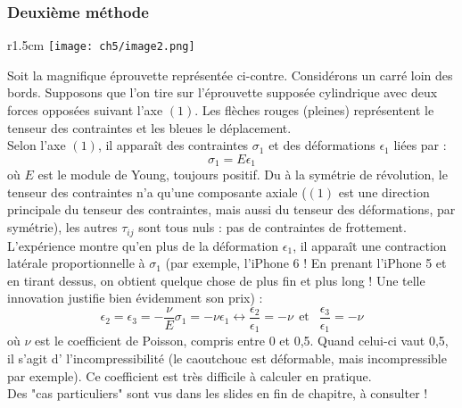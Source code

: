 \subsubsection{Deuxième méthode}
\begin{wrapfigure}[15]{r}{1.5cm}
	\texttt{[image: ch5/image2.png]}
\end{wrapfigure}
Soit la magnifique éprouvette représentée ci-contre. Considérons un carré loin des bords.
Supposons que l'on tire sur l'éprouvette supposée cylindrique avec deux forces opposées 
suivant l'axe $(1)$. Les flèches rouges (pleines) représentent le tenseur des contraintes
et les bleues le déplacement.\\
Selon l'axe $(1)$, il apparaît des contraintes $\sigma_1$ et des déformations $\epsilon_1$ 
liées par :
\begin{equation}
	\sigma_1 = E\epsilon_1
\end{equation}
où $E$ est le module de Young, toujours positif. Du à la symétrie de révolution, le tenseur
des contraintes n'a qu'une composante axiale ($(1)$ est une direction principale du tenseur
des contraintes, mais aussi du tenseur des déformations, par symétrie), les autres $
\tau_{ij}$ sont tous nuls : pas de contraintes de frottement.\\
    
L'expérience montre qu'en plus de la déformation $\epsilon_1$, il apparaît une contraction 
latérale proportionnelle à $\sigma_1$ (par exemple, l'iPhone 6 ! En prenant l'iPhone 5 et en
tirant dessus, on obtient quelque chose de plus fin et plus long ! Une telle innovation 
justifie bien évidemment son prix) :
\begin{equation}
	\epsilon_2 = \epsilon_3 = -\frac{\nu}{E}\sigma_1 = -\nu \epsilon_1 \leftrightarrow 
	\frac{\epsilon_2}{\epsilon_1}= -\nu\ \ \text{et }\ \ \frac{\epsilon_3}{\epsilon_1} = -\nu
\end{equation}
où $\nu$ est le coefficient de Poisson, compris entre 0 et 0,5. Quand celui-ci vaut 0,5, il
s'agit d' l'incompressibilité (le caoutchouc est déformable, mais incompressible par exemple).
Ce coefficient est très difficile à calculer en pratique.\\
    
Des "cas particuliers" sont vus dans les slides en fin de chapitre, à consulter !
